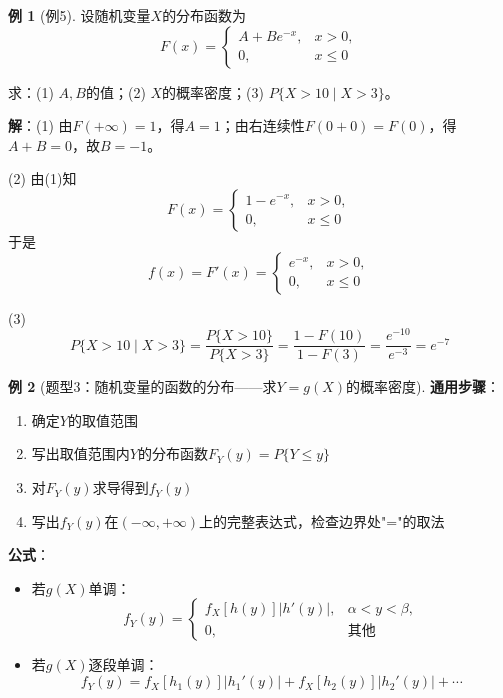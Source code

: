 \documentclass[11pt,a4paper]{report}
\theoremstyle{definition}
\newtheorem{example}{例}[chapter]
\theoremstyle{plain}
\begin{document}
\begin{example}[例5]
设随机变量\(X\)的分布函数为
\[
F(x)=\begin{cases}
A+Be^{-x}, & x>0, \\[6pt]
0, & x\leq 0
\end{cases}
\]

求：(1) \(A,B\)的值；(2) \(X\)的概率密度；(3) \(P\{X>10\mid X>3\}\)。

\textbf{解}：(1) 由\(F(+\infty)=1\)，得\(A=1\)；由右连续性\(F(0+0)=F(0)\)，得\(A+B=0\)，故\(B=-1\)。

(2) 由(1)知
\[
F(x)=\begin{cases}
1-e^{-x}, & x>0, \\[6pt]
0, & x\leq 0
\end{cases}
\]
于是
\[
f(x)=F'(x)=\begin{cases}
e^{-x}, & x>0, \\[6pt]
0, & x\leq 0
\end{cases}
\]

(3)
\[
P\{X>10\mid X>3\}=\frac{P\{X>10\}}{P\{X>3\}}=\frac{1-F(10)}{1-F(3)}=\frac{e^{-10}}{e^{-3}}=e^{-7}
\]
\end{example}

\begin{example}[题型3：随机变量的函数的分布——求\(Y=g(X)\)的概率密度]

\textbf{通用步骤}：
\begin{enumerate}[label=\arabic*.,leftmargin=2em]
    \item 确定\(Y\)的取值范围
    \item 写出取值范围内\(Y\)的分布函数\(F_Y(y)=P\{Y\leq y\}\)
    \item 对\(F_Y(y)\)求导得到\(f_Y(y)\)
    \item 写出\(f_Y(y)\)在\((-\infty,+\infty)\)上的完整表达式，检查边界处"="的取法
\end{enumerate}

\textbf{公式}：
\begin{itemize}[leftmargin=2em]
    \item 若\(g(X)\)单调：
    \[
    f_Y(y)=\begin{cases}
    f_X[h(y)]|h'(y)|, & \alpha<y<\beta, \\[6pt]
    0, & \text{其他}
    \end{cases}
    \]
    \item 若\(g(X)\)逐段单调：
    \[
    f_Y(y)=f_X[h_1(y)]|h_1'(y)|+f_X[h_2(y)]|h_2'(y)|+\cdots
    \]
\end{itemize}
\end{example}
\end{document}
